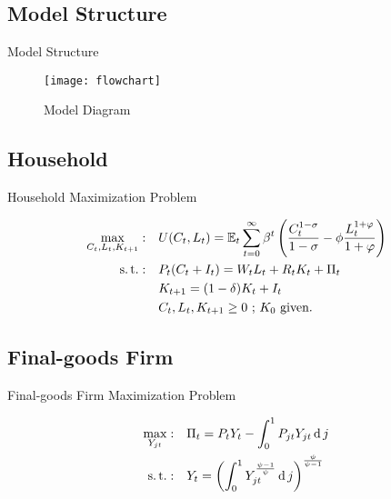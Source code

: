 \documentclass[
presentation.tex
]{subfiles}
\begin{document}

	\subsection{Model Structure}

	\begin{frame}{Model Structure}
		
		\begin{figure}[h!]
		\centering
		\texttt{[image: flowchart]}
		\caption{Model Diagram}
		\label{fig:model-diagram}
		\end{figure}	
		
	\end{frame}


\subsection{Household}

\begin{frame}{Household Maximization Problem}
	
	\begin{align}
		\label{eq:household-utility-function}
		\max_{C_t,L_t,K_{t+1}}: \quad & U(C_t,L_t) = {\mathbb{E}_{t}} \sum_{t=0}^{\infty} \beta^t \left(\frac{C_t^{1-\sigma}}{1-\sigma} - \phi \frac{L_t^{1+\varphi}}{1+\varphi} \right) \\
		\label{eq:household-budget-constraint}
		\operatorname{s.t.}: \quad & P_t (C_t + I_t) = W_t L_t + R_t K_t + \Pi_t \\
		\label{eq:law-of-motion-for-capital}
		\quad & K_{t+1} = (1-\delta)K_t + I_t \\
		\quad & C_t,L_t,K_{t+1} \geq 0 \text{ ; $K_0$ given.} \nonumber
	\end{align}
	
\end{frame}


\subsection{Final-goods Firm}

	\begin{frame}{Final-goods Firm Maximization Problem}
	
	\begin{align}
		\label{eq:final-good-firm-max-problem}
		\max_{Y_{jt}}: &\quad \Pi_t = P_t Y_t - \int_{0}^{1} P_{jt} Y_{jt} \operatorname{d} j\\
		\label{eq:final-good-firm-bundle-rule}
		\operatorname{s.t.}: & \quad Y_t = \left( \int_{0}^{1} Y_{jt}^{\frac{\psi-1}{\psi}} \operatorname{d} j \right)^{\frac{\psi}{\psi-1}}
	\end{align}
	
	
	\end{frame}
\end{document}
